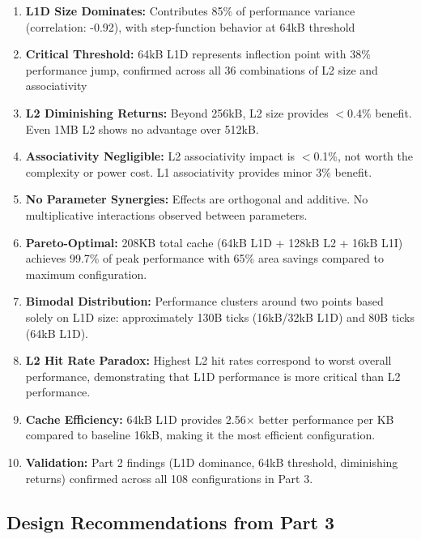 \documentclass[11pt,a4paper]{article}
\begin{document}
\begin{enumerate}[noitemsep]
    \item \textbf{L1D Size Dominates:} Contributes 85\% of performance variance (correlation: -0.92), with step-function behavior at 64kB threshold

    \item \textbf{Critical Threshold:} 64kB L1D represents inflection point with 38\% performance jump, confirmed across all 36 combinations of L2 size and associativity

    \item \textbf{L2 Diminishing Returns:} Beyond 256kB, L2 size provides $<$0.4\% benefit. Even 1MB L2 shows no advantage over 512kB.

    \item \textbf{Associativity Negligible:} L2 associativity impact is $<$0.1\%, not worth the complexity or power cost. L1 associativity provides minor 3\% benefit.

    \item \textbf{No Parameter Synergies:} Effects are orthogonal and additive. No multiplicative interactions observed between parameters.

    \item \textbf{Pareto-Optimal:} 208KB total cache (64kB L1D + 128kB L2 + 16kB L1I) achieves 99.7\% of peak performance with 65\% area savings compared to maximum configuration.

    \item \textbf{Bimodal Distribution:} Performance clusters around two points based solely on L1D size: approximately 130B ticks (16kB/32kB L1D) and 80B ticks (64kB L1D).

    \item \textbf{L2 Hit Rate Paradox:} Highest L2 hit rates correspond to worst overall performance, demonstrating that L1D performance is more critical than L2 performance.

    \item \textbf{Cache Efficiency:} 64kB L1D provides 2.56× better performance per KB compared to baseline 16kB, making it the most efficient configuration.

    \item \textbf{Validation:} Part 2 findings (L1D dominance, 64kB threshold, diminishing returns) confirmed across all 108 configurations in Part 3.
\end{enumerate}

\subsection{Design Recommendations from Part 3}
\end{document}
